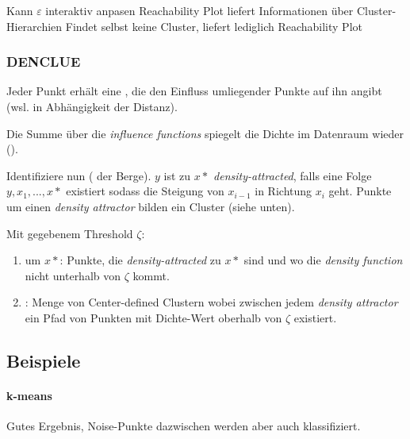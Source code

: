 \documentclass[10pt]{article} %
\begin{document}
\begin{cptitemize} 
   \advantageit Kann $\varepsilon$ interaktiv anpasen
   \advantageit Reachability Plot liefert Informationen über Cluster-Hierarchien
   \disadvantageit Findet selbst keine Cluster, liefert lediglich Reachability Plot
\end{cptitemize} 


\myhline
\subsubsection{DENCLUE}

Jeder Punkt erhält eine , die den Einfluss
umliegender Punkte auf ihn angibt (wsl. in Abhängigkeit der Distanz).

Die Summe über die \textit{influence functions} spiegelt die Dichte im Datenraum
wieder ().

Identifiziere nun  ( der Berge).
$y$ ist zu $x*$ \textit{density-attracted}, falls eine Folge $y, x_1, ..., x*$
existiert sodass die Steigung von $x_{i-1}$ in Richtung $x_i$ geht. Punkte um
einen \textit{density attractor} bilden ein Cluster (siehe unten).

Mit gegebenem Threshold $\zeta$:
\begin{enumerate}
\item {} um $x*$: Punkte, die
  \textit{density-attracted} zu $x*$ sind und wo die \textit{density function}
  nicht unterhalb von $\zeta$ kommt.
\item {}: Menge von
  Center-defined Clustern wobei zwischen jedem \textit{density attractor} ein
  Pfad von Punkten mit Dichte-Wert oberhalb von $\zeta$ existiert.
\end{enumerate}


\pagebreak
\subsection{Beispiele}

\paragraph{k-means} Gutes Ergebnis, Noise-Punkte dazwischen werden aber auch
klassifiziert.
\end{document}
